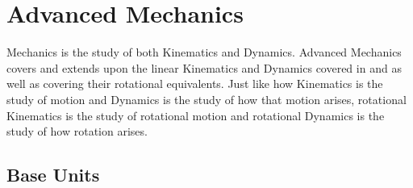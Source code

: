 \documentclass[main.tex]{subfiles}
\begin{document}
  
    \chapter{Advanced Mechanics}
        \label{ch: Advanced Mechanics}
        \thispagestyle{noheader}

        Mechanics is the study of both Kinematics and Dynamics. Advanced Mechanics covers and extends upon the linear Kinematics and Dynamics covered in  and  as well as covering their rotational equivalents. Just like how Kinematics is the study of motion and Dynamics is the study of how that motion arises, rotational Kinematics is the study of rotational motion and rotational Dynamics is the study of how rotation arises.

        \section{Base Units}
            \label{sec: Base Units Kinematics}
\end{document}
